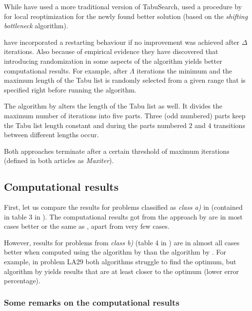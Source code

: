 \documentclass[14pt]{article}
\begin{document}
While \citet{amico-trubian} have used a more traditional version of TabuSearch, \citet{pezzella} used a procedure by \citet{carlier} for local reoptimization for the newly found better solution (based on the \textit{shifting bottleneck} algorithm).

\citet{amico-trubian} have incorporated a restarting behaviour if no improvement was achieved after $\Delta$ iterations. Also because of empirical evidence they have discovered that introducing randomization in some aspects of the algorithm yields better computational results. For example, after $\Lambda$ iterations the minimum and the maximum length of the Tabu list is randomly selected from a given range that is specified right before running the algorithm.

The algorithm by \citet{pezzella} alters the length of the Tabu list as well. It divides the maximum number of iterations into five parts. Three (odd numbered) parts keep the Tabu list length constant and during the parts numbered $2$ and $4$ transitions between different lengths occur.

Both approaches terminate after a certain threshold of maximum iterations (defined in both articles as \textit{Maxiter}).

\subsection{Computational results}

First, let us compare the results for problems classified as \textit{class a)} in \cite{pezzella} (contained in table 3 in \cite{amico-trubian}). The computational results got from the approach by \citet{pezzella} are in most cases better or the same as \citet{amico-trubian}, apart from very few cases.

However, results for problems from \textit{class b)} (table 4 in \cite{amico-trubian}) are in almost all cases better when computed using the algorithm by \citet{pezzella} than the algorithm by \citet{amico-trubian}. For example, in problem LA29 both algorithms struggle to find the optimum, but algorithm by \citet{pezzella} yields results that are at least closer to the optimum (lower error percentage).

\subsubsection{Some remarks on the computational results}
\end{document}
